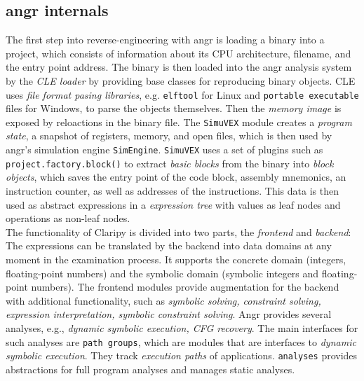 \documentclass[seminar]{plai}
\begin{document}
\subsection{angr internals}
\label{sec:angr-internals}

The first step into reverse-engineering with angr is loading a binary into a project, which consists of information about its CPU architecture, filename, and the entry point address.\cite{core-concepts} The binary is then loaded into the angr analysis system by the \textit{CLE loader} by providing base classes for reproducing binary objects.
CLE uses \textit{file format pasing libraries}, e.g. \texttt{elftool} for Linux and \texttt{portable executable} files for Windows, to parse the objects themselves.
Then the \textit{memory image} is exposed by reloactions in the binary file.\cite{art-of-war-angr}
The \texttt{SimuVEX} module creates a \textit{program state}, a snapshot of registers, memory, and open files, which is then used by angr's simulation engine \texttt{SimEngine}.
\texttt{SimuVEX} uses a set of plugins such as \texttt{project.factory.block()} to extract \textit{basic blocks} from the binary into \textit{block objects}, which saves the entry point of the code block, assembly mnemonics, an instruction counter, as well as addresses of the instructions.\cite{art-of-war-angr,core-concepts}
This data is then used as abstract expressions in a \textit{expression tree} with values as leaf nodes and operations as non-leaf nodes.\\
The functionality of Claripy is divided into two parts, the \textit{frontend} and \textit{backend}:
The expressions can be translated by the backend into data domains at any moment in the examination process.  
It supports the concrete domain (integers, floating-point numbers) and the symbolic domain (symbolic integers and floating-point numbers).
The frontend modules provide augmentation for the backend with additional functionality, such as \textit{symbolic solving, constraint solving, expression interpretation, symbolic constraint solving}.
Angr provides several analyses, e.g., \textit{dynamic symbolic execution, CFG recovery}. The main interfaces for such analyses are \texttt{path groups}, which are modules that are interfaces to \textit{dynamic symbolic execution}. They track \textit{execution paths} of applications.
\texttt{analyses} provides abstractions for full program analyses and manages static analyses.
\end{document}

